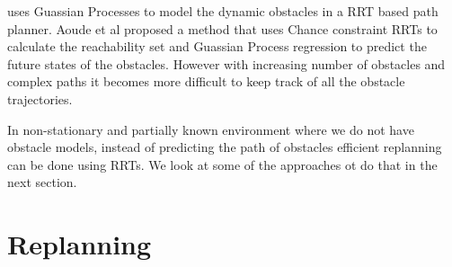 \documentclass[MTech]{iitmdiss}
\begin{document}
\cite{fulgenzi08}  
  uses Guassian Processes to model the dynamic obstacles in a RRT based path planner. Aoude et al
  \cite{aoude13}
proposed a method that uses Chance constraint RRTs to calculate the reachability set and Guassian Process regression to predict the future states of the obstacles. However with increasing number of obstacles and complex paths it becomes more difficult to keep track of all the obstacle trajectories. 

In non-stationary and partially known environment where we do not have obstacle models, instead of predicting the path of obstacles efficient replanning can be done using RRTs. We look at some of the approaches ot do that in the next section.

 \section{Replanning}
 
\end{document}
